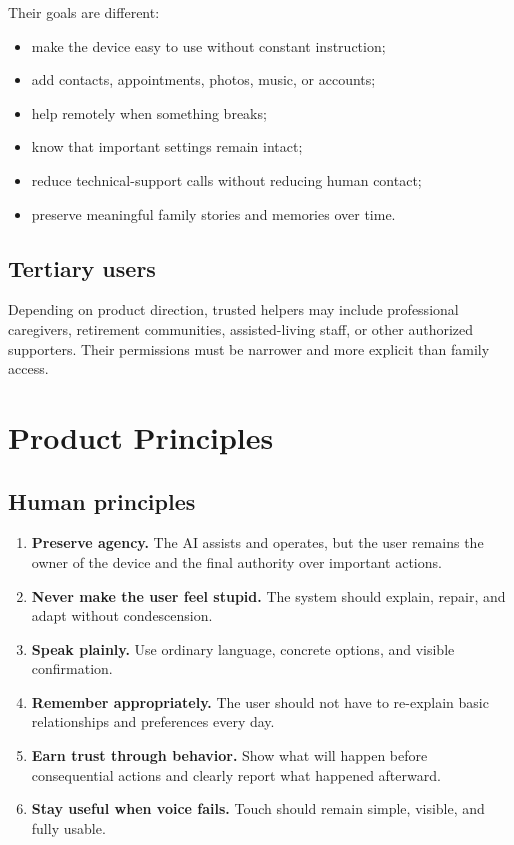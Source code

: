 \documentclass[11pt]{article}
\newcommand{\principle}[2]{\textbf{#1.} #2}
\begin{document}
Their goals are different:

\begin{itemize}[leftmargin=*]
    \item make the device easy to use without constant instruction;
    \item add contacts, appointments, photos, music, or accounts;
    \item help remotely when something breaks;
    \item know that important settings remain intact;
    \item reduce technical-support calls without reducing human contact;
    \item preserve meaningful family stories and memories over time.
\end{itemize}

\subsection{Tertiary users}
Depending on product direction, trusted helpers may include professional caregivers, retirement communities, assisted-living staff, or other authorized supporters. Their permissions must be narrower and more explicit than family access.

\section{Product Principles}

\subsection{Human principles}
\begin{enumerate}[leftmargin=*]
    \item \principle{Preserve agency}{The AI assists and operates, but the user remains the owner of the device and the final authority over important actions.}
    \item \principle{Never make the user feel stupid}{The system should explain, repair, and adapt without condescension.}
    \item \principle{Speak plainly}{Use ordinary language, concrete options, and visible confirmation.}
    \item \principle{Remember appropriately}{The user should not have to re-explain basic relationships and preferences every day.}
    \item \principle{Earn trust through behavior}{Show what will happen before consequential actions and clearly report what happened afterward.}
    \item \principle{Stay useful when voice fails}{Touch should remain simple, visible, and fully usable.}
\end{enumerate}
\end{document}
